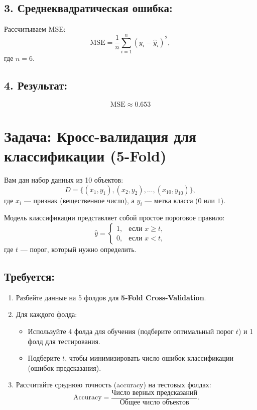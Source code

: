 \subsection*{3. Среднеквадратическая ошибка:}
Рассчитываем MSE:
\[
\text{MSE} = \frac{1}{n} \sum_{i=1}^n (y_i - \hat{y}_i)^2,
\]
где \( n = 6 \).

\subsection*{4. Результат:}
\[
\text{MSE} \approx 0.653
\]

\section*{Задача: Кросс-валидация для классификации (5-Fold)}

Вам дан набор данных из 10 объектов:
\[
D = \{ (x_1, y_1), (x_2, y_2), \dots, (x_{10}, y_{10}) \},
\]
где \( x_i \) — признак (вещественное число), а \( y_i \) — метка класса (\( 0 \) или \( 1 \)).

Модель классификации представляет собой простое пороговое правило:
\[
\hat{y} =
\begin{cases} 
1, & \text{если } x \geq t, \\
0, & \text{если } x < t,
\end{cases}
\]
где \( t \) — порог, который нужно определить.

\subsection*{Требуется:}
\begin{enumerate}
    \item Разбейте данные на 5 фолдов для \textbf{5-Fold Cross-Validation}.
    \item Для каждого фолда:
    \begin{itemize}
        \item Используйте 4 фолда для обучения (подберите оптимальный порог \( t \)) и 1 фолд для тестирования.
        \item Подберите \( t \), чтобы минимизировать число ошибок классификации (ошибок предсказания).
    \end{itemize}
    \item Рассчитайте среднюю точность (accuracy) на тестовых фолдах:
    \[
    \text{Accuracy} = \frac{\text{Число верных предсказаний}}{\text{Общее число объектов}}.
    \]
\end{enumerate}

